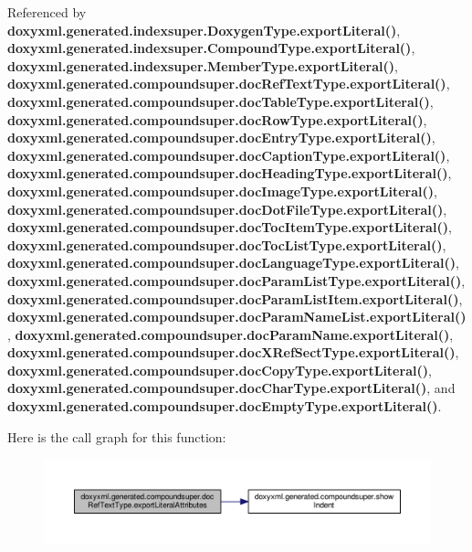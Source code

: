 Referenced by {\bf doxyxml.\+generated.\+indexsuper.\+Doxygen\+Type.\+export\+Literal()}, {\bf doxyxml.\+generated.\+indexsuper.\+Compound\+Type.\+export\+Literal()}, {\bf doxyxml.\+generated.\+indexsuper.\+Member\+Type.\+export\+Literal()}, {\bf doxyxml.\+generated.\+compoundsuper.\+doc\+Ref\+Text\+Type.\+export\+Literal()}, {\bf doxyxml.\+generated.\+compoundsuper.\+doc\+Table\+Type.\+export\+Literal()}, {\bf doxyxml.\+generated.\+compoundsuper.\+doc\+Row\+Type.\+export\+Literal()}, {\bf doxyxml.\+generated.\+compoundsuper.\+doc\+Entry\+Type.\+export\+Literal()}, {\bf doxyxml.\+generated.\+compoundsuper.\+doc\+Caption\+Type.\+export\+Literal()}, {\bf doxyxml.\+generated.\+compoundsuper.\+doc\+Heading\+Type.\+export\+Literal()}, {\bf doxyxml.\+generated.\+compoundsuper.\+doc\+Image\+Type.\+export\+Literal()}, {\bf doxyxml.\+generated.\+compoundsuper.\+doc\+Dot\+File\+Type.\+export\+Literal()}, {\bf doxyxml.\+generated.\+compoundsuper.\+doc\+Toc\+Item\+Type.\+export\+Literal()}, {\bf doxyxml.\+generated.\+compoundsuper.\+doc\+Toc\+List\+Type.\+export\+Literal()}, {\bf doxyxml.\+generated.\+compoundsuper.\+doc\+Language\+Type.\+export\+Literal()}, {\bf doxyxml.\+generated.\+compoundsuper.\+doc\+Param\+List\+Type.\+export\+Literal()}, {\bf doxyxml.\+generated.\+compoundsuper.\+doc\+Param\+List\+Item.\+export\+Literal()}, {\bf doxyxml.\+generated.\+compoundsuper.\+doc\+Param\+Name\+List.\+export\+Literal()}, {\bf doxyxml.\+generated.\+compoundsuper.\+doc\+Param\+Name.\+export\+Literal()}, {\bf doxyxml.\+generated.\+compoundsuper.\+doc\+X\+Ref\+Sect\+Type.\+export\+Literal()}, {\bf doxyxml.\+generated.\+compoundsuper.\+doc\+Copy\+Type.\+export\+Literal()}, {\bf doxyxml.\+generated.\+compoundsuper.\+doc\+Char\+Type.\+export\+Literal()}, and {\bf doxyxml.\+generated.\+compoundsuper.\+doc\+Empty\+Type.\+export\+Literal()}.



Here is the call graph for this function\+:
\nopagebreak
\begin{figure}[H]
\begin{center}
\leavevmode
\includegraphics[width=350pt]{d6/d3c/classdoxyxml_1_1generated_1_1compoundsuper_1_1docRefTextType_a76a85f9286da835ad45ee8c799141852_cgraph}
\end{center}
\end{figure}




